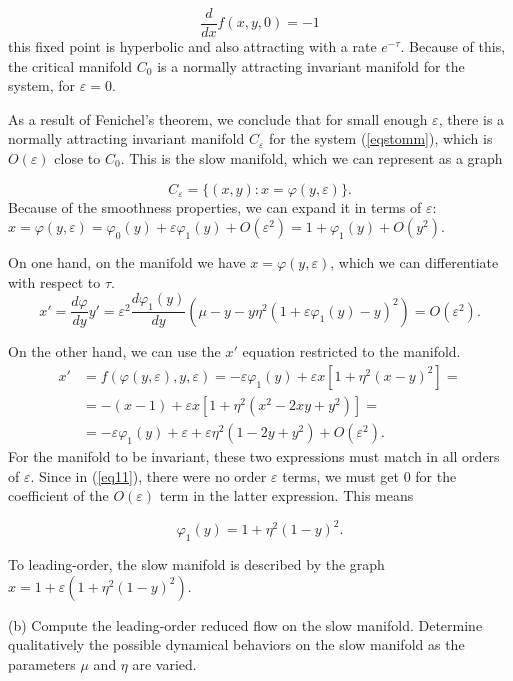 \documentclass[a4paper,11pt,pdftex]{article}
\begin{document}
$$
\frac{d}{dx}f(x,y,0) = -1
$$
this fixed point is hyperbolic and also attracting with a rate $e^{-\tau}$. Because of this, the critical manifold $C_0$ is a normally attracting invariant manifold for the system, for $\varepsilon = 0$. 

As a result of Fenichel's theorem, we conclude that for small enough $\varepsilon$, there is a normally attracting invariant manifold $C_\varepsilon$ for the system (\ref{eqstomm}), which is $O(\varepsilon)$ close to $C_0$. This is the slow manifold, which we can represent as a graph

$$
C_\varepsilon = \{ (x,y): x = \varphi(y,\varepsilon)\}.
$$
Because of the smoothness properties, we can expand it in terms of $\varepsilon$: $x = \varphi(y,\varepsilon) = \varphi_0(y) + \varepsilon \varphi_1(y) + O(\varepsilon^2) = 1+\varphi_1(y)+O(y^2)$.


On one hand, on the manifold we have $x = \varphi(y,\varepsilon)$, which we can differentiate with respect to $\tau$.
\begin{equation}
    \label{eq11}
    x' = \frac{d \varphi}{d y} y' = \varepsilon^2 \frac{d\varphi_1(y)}{dy}\left( \mu- y -y\eta^2(1+\varepsilon\varphi_1(y) -y)^2\right) = O(\varepsilon^2).
\end{equation}

On the other hand, we can use the $x'$ equation restricted to the manifold. 
\begin{align*}
        \label{eq22}
    x' &= f(\varphi(y,\varepsilon),y,\varepsilon) = -\varepsilon \varphi_1(y) + \varepsilon x[1+\eta^2(x-y)^2]= \\
    &= -(x-1) + \varepsilon x[1+\eta^2(x^2-2xy + y^2)] = \\
    &= -\varepsilon\varphi_1(y) + \varepsilon + \varepsilon \eta^2(1-2y +y^2) +O(\varepsilon^2).
\end{align*}
For the manifold to be invariant, these two expressions must match in all orders of $\varepsilon$. Since in (\ref{eq11}), there were no order $\varepsilon$ terms, we must get 0 for the coefficient of the $O(\varepsilon)$ term in the latter expression. This means

$$
\varphi_1(y)= 1 + \eta^2(1-y)^2.
$$

To leading-order, the slow manifold is described by the graph $x = 1 + \varepsilon(1+\eta^2(1-y)^2)$.

(b) Compute the leading-order reduced flow on the slow manifold. Determine qualitatively the possible dynamical behaviors on the slow manifold as the parameters $\mu$ and $\eta$ are varied.
\end{document}
